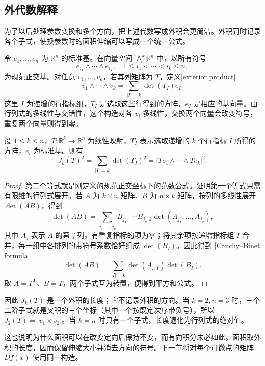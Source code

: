 \subsection{外代数解释}
\label{b1:subsec:170104}

为了以后处理参数变换和多个方向，把上述代数写成外积会更简洁。外积同时记录各个子式，使换参数时的面积伸缩可以写成一个统一公式。

\ProseParagraphBreak

令 \(e_1,\ldots,e_n\) 为 \(\mathbb R^n\) 的标准基。在向量空间 \(\bigwedge^k\mathbb R^n\) 中，以所有符号
\[
 e_{i_1}\wedge\cdots\wedge e_{i_k},
 \quad 1\leq i_1<\cdots<i_k\leq n,
\]
为规范正交基。对任意 \(v_1,\ldots,v_k\)，若其列矩阵为 \(T\)，定义[exterior product]
\[
 v_1\wedge\cdots\wedge v_k
 =\sum_{|I|=k}\det(T_I)e_I.
\]
这里 \(I\) 为递增的行指标组，\(T_I\) 是选取这些行得到的方阵，\(e_I\) 是相应的基向量。由行列式的多线性与交错性，这个构造对各 \(v_i\) 多线性，交换两个向量会改变符号，重复两个向量则得到零。

\begin{proposition}\label{b1:prop:jacobian-minors}
设 \(1\le k\le n\)，\(T:\mathbb R^k\to\mathbb R^n\) 为线性映射，\(T_I\) 表示选取递增的 \(k\) 个行指标 \(I\) 所得的方阵，\(e_i\) 为标准基。则有
\[
 J_k(T)^2=\sum_{|I|=k}\det(T_I)^2
 =|Te_1\wedge\cdots\wedge Te_k|^2.
\]
\end{proposition}
\begin{proof}
第二个等式就是刚定义的规范正交坐标下的范数公式。证明第一个等式只需有限维的行列式展开。若 \(A\) 为 \(k\times n\) 矩阵、\(B\) 为 \(n\times k\) 矩阵，按列的多线性展开 \(\det(AB)\)，得到
\[
 \det(AB)
 =\sum_{j_1,\ldots,j_k}
 B_{j_1,1}\cdots B_{j_k,k}
 \det(A_{j_1},\ldots,A_{j_k}),
\]
其中 \(A_j\) 表示 \(A\) 的第 \(j\) 列。有重复指标的项为零；将其余项按递增指标组 \(I\) 合并，每一组中各排列的带符号系数恰好组成 \(\det(B_I)\)。因此得到 [Cauchy--Binet formula]
\[
 \det(AB)=\sum_{|I|=k}\det(A_{:,I})\det(B_I).
\]
取 \(A=T^{\mathsf T}\)、\(B=T\)，两个子式互为转置，便得到平方和公式。
\end{proof}

因此 \(J_k(T)\) 是一个外积的长度；它不记录外积的方向。当 \(k=2,n=3\) 时，三个二阶子式就是叉积的三个坐标（其中一个按既定次序带负号），所以 \(J_2(T)=|v_1\times v_2|\)。当 \(k=n\) 时只有一个子式，长度退化为行列式的绝对值。

\ProseParagraphBreak

这也说明为什么面积可以在改变定向后保持不变，而有向积分未必如此。面积取外积的长度，因而保留伸缩大小并消去方向的符号。下一节将对每个可微点的矩阵 \(Df(x)\) 使用同一构造。
